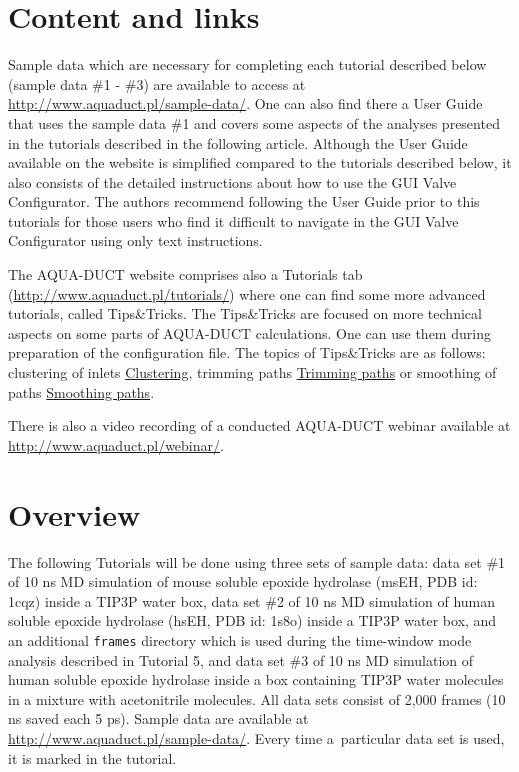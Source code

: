 \documentclass[9pt,tutorial, pubversion]{livecoms}
\begin{document}
\section{Content and links}

Sample data which are necessary for completing each tutorial described below (sample data \#1 - \#3) are available to access at \url{http://www.aquaduct.pl/sample-data/}. One can also find there a User Guide that uses the sample data \#1 and covers some aspects of the analyses presented in the tutorials described in the following article. Although the User Guide available on the website is simplified compared to the tutorials described below, it also consists of the detailed instructions about how to use the GUI Valve Configurator. The authors recommend following the User Guide prior to this tutorials for those users who find it difficult to navigate in the GUI Valve Configurator using only text instructions. 

The AQUA-DUCT website comprises also a Tutorials tab (\url{http://www.aquaduct.pl/tutorials/}) where one can find some more advanced tutorials, called Tips\&Tricks. The Tips\&Tricks are focused on more technical aspects on some parts of AQUA-DUCT calculations. One can use them during preparation of the configuration file. The topics of Tips\&Tricks are as follows: clustering of inlets \href{http://www.aquaduct.pl/clustering/}{Clustering}, trimming paths \href{http://www.aquaduct.pl/trimming-paths/}{Trimming paths} or smoothing of paths \href{http://www.aquaduct.pl/smoothing-paths/}{Smoothing paths}.

There is also a video recording of a conducted AQUA-DUCT webinar available at \url{http://www.aquaduct.pl/webinar/}.

\section{Overview}
The following Tutorials will be done using three sets of sample data: data set \#1 of 10 ns MD simulation of mouse soluble epoxide hydrolase (msEH, PDB id: 1cqz) inside a TIP3P water box, data set \#2 of 10 ns MD simulation of human soluble epoxide hydrolase (hsEH, PDB id: 1s8o) inside a TIP3P water box, and an additional \texttt{frames} directory which is used during the time-window mode analysis described in Tutorial 5, and data set \#3 of 10 ns MD simulation of human soluble epoxide hydrolase inside a box containing TIP3P water molecules in a mixture with acetonitrile molecules. All data sets consist of 2,000 frames (10 ns saved each 5 ps). Sample data are available at \url{http://www.aquaduct.pl/sample-data/}. Every time a~particular data set is used, it is marked in the tutorial.
\end{document}
